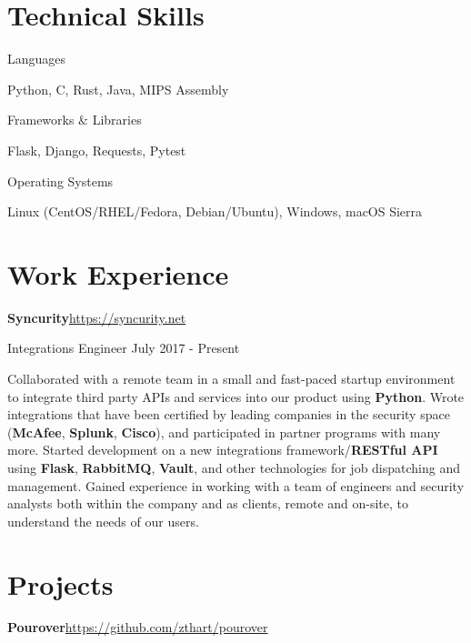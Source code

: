 \documentclass[margin,line]{resume}
\newcommand{\rurl}[1]{\hfill {\footnotesize \url{#1}}}
\begin{document}
\begin{resume}
\section{\mysidestyle Technical Skills}
	\begin{compactdesc}
		\item[Languages] \begin{inparaenum} { \small
			Python, C, Rust, Java, MIPS Assembly
		} \end{inparaenum}
        \item[Frameworks \& Libraries] \begin{inparaenum} { \small
        	Flask, Django, Requests, Pytest
        } \end{inparaenum}
		\item[Operating Systems] \begin{inparaenum} { \small
			Linux (CentOS/RHEL/Fedora, Debian/Ubuntu), Windows, macOS Sierra
		} \end{inparaenum}
        \normalsize
	\end{compactdesc}

\section{\mysidestyle Work Experience}
	\begin{asparablank}
		\item{\bf Syncurity}\rurl{https://syncurity.net}
		\small \item Integrations Engineer \hfill July 2017 - Present
		\linebreak

		\small Collaborated with a remote team in a small and fast-paced startup environment to integrate third party APIs and services into our product using \textbf{Python}.
		\small Wrote integrations that have been certified by leading companies in the security space (\textbf{McAfee}, \textbf{Splunk}, \textbf{Cisco}), and participated in partner programs with many more.
		\small Started development on a new integrations framework/\textbf{RESTful API} using \textbf{Flask}, \textbf{RabbitMQ}, \textbf{Vault}, and other technologies for job dispatching and management.
		\small Gained experience in working with a team of engineers and security analysts both within the company and as clients, remote and on-site, to understand the needs of our users.
	\end{asparablank}

\section{\mysidestyle Projects}
	\begin{asparablank}
		\item {\bf Pourover}\rurl{https://github.com/zthart/pourover}


\end{asparablank}
\end{resume}
\end{document}
